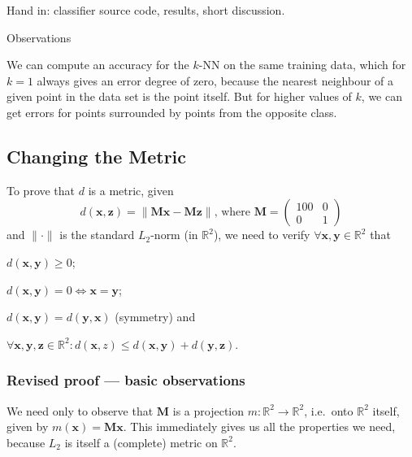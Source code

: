 \documentclass{article}
\newcommand{\vect}[1]{\ensuremath{\boldsymbol{\mathbf{#1}}}\xspace}
\begin{document}
Hand in: classifier source code, results, short discussion.

Observations

We can compute an accuracy for the $k$-NN on the same training data, which for $k = 1$ always gives an error degree of zero, because the nearest neighbour of a given point in the data set is the point itself. But for higher values of $k$, we can get errors for points surrounded by points from the opposite class.


\subsection{Changing the Metric}

To prove that $d$ is a metric, given
\[
d(\vect{x},\vect{z}) = \|\vect{M}\vect{x} - \vect{M}\vect{z}\|\text{,
  where } \vect{M} = \begin{pmatrix} 100 & 0 \\ 0 & 1\end{pmatrix}
\]
and $\|\cdot\|$ is the standard $L_2$-norm (in $\mathbb{R}^2$), we
need to verify $\forall \vect{x},\vect{y}\in \mathbb{R}^2$ that
\begin{inparaenum}[1)]
  \item $d(\vect{x},\vect{y}) \geq 0$; 
  \item $d(\vect{x},\vect{y}) = 0 \Leftrightarrow \vect{x} = \vect{y}$;
  \item $d(\vect{x},\vect{y}) =  d(\vect{y},\vect{x})$ (symmetry) and
  \item $\forall \vect{x},\vect{y},\vect{z} \in \mathbb{R}^2 : d(\vect{x},z) \leq d(\vect{x},\vect{y}) + d(\vect{y},\vect{z})$.
\end{inparaenum}

\subsubsection{Revised proof --- basic observations}

We need only to observe that $\vect{M}$ is a projection $m : \mathbb{R}^2 \rightarrow \mathbb{R}^2$, i.e.\ onto $\mathbb{R}^2$ itself, given by $m(\vect{x}) = \vect{M}\vect{x}$. This immediately gives us all the properties we need, because $L_2$ is itself a (complete) metric on $\mathbb{R}^2$.
\end{document}
